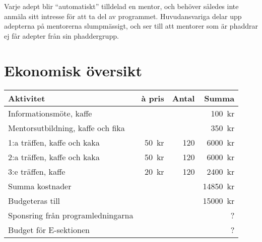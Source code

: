 \documentclass[10pt]{article}
\begin{document}
    Varje adept blir ``automatiskt'' tilldelad en mentor, och behöver således inte anmäla sitt intresse för att ta del av programmet. Huvudansvariga delar upp adepterna på mentorerna slumpmässigt, och ser till att mentorer som är phaddrar ej får adepter från sin phaddergrupp.

    \newpage

    \section{Ekonomisk översikt}
    \begin{tabularx}{\textwidth}{Xrrr}
        \textbf{Aktivitet} & \textbf{\`a pris} & \textbf{Antal} & \textbf{Summa} \\
        \hline
        Informationsmöte, kaffe & & & \SI{100}{kr} \\
        Mentorsutbildning, kaffe och fika & & & \SI{350}{kr} \\
        1:a träffen, kaffe och kaka & \SI{50}{kr} & 120 & \SI{6000}{kr} \\
        2:a träffen, kaffe och kaka & \SI{50}{kr} & 120 & \SI{6000}{kr} \\
        3:e träffen, kaffe & \SI{20}{kr} & 120 & \SI{2400}{kr} \\
        \hline
        Summa kostnader & & & \SI{14850}{kr}\\
        Budgeteras till & & & \SI{15000}{kr}\\
        Sponsring från programledningarna & & & ? \\
        \hline
        Budget för E-sektionen & & & ? \\
    \end{tabularx}

    \vspace*{\baselineskip}
\end{document}
